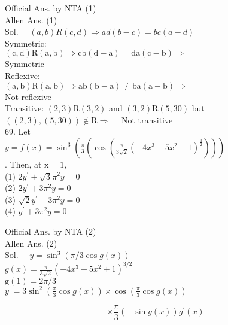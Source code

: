 \documentclass[10pt]{article}
\begin{document}
Official Ans. by NTA (1)\\
Allen Ans. (1)\\
Sol. \(\quad(a, b) R(c, d) \Rightarrow a d(b-c)=b c(a-d)\)\\
Symmetric:\\
\((\mathrm{c}, \mathrm{d}) \mathrm{R}(\mathrm{a}, \mathrm{b}) \Rightarrow \mathrm{cb}(\mathrm{d}-\mathrm{a})=\mathrm{da}(\mathrm{c}-\mathrm{b}) \Rightarrow\)\\
Symmetric\\
Reflexive:\\
\((\mathrm{a}, \mathrm{b}) \mathrm{R}(\mathrm{a}, \mathrm{b}) \Rightarrow \mathrm{ab}(\mathrm{b}-\mathrm{a}) \neq \mathrm{ba}(\mathrm{a}-\mathrm{b}) \Rightarrow\)\\
Not reflexive\\
Transitive: \((2,3) \mathrm{R}(3,2)\) and \((3,2) \mathrm{R}(5,30)\) but\\
\(((2,3),(5,30)) \notin \mathrm{R} \Rightarrow \quad\) Not transitive\\
69. Let\\
\(y=f(x)=\sin ^{3}\left(\frac{\pi}{3}\left(\cos \left(\frac{\pi}{3 \sqrt{2}}\left(-4 x^{3}+5 x^{2}+1\right)^{\frac{3}{2}}\right)\right)\right)\)\\
. Then, at \(\mathrm{x}=1\),\\
(1) \(2 y^{\prime}+\sqrt{3} \pi^{2} y=0\)\\
(2) \(2 y^{\prime}+3 \pi^{2} y=0\)\\
(3) \(\sqrt{2} y^{\prime}-3 \pi^{2} y=0\)\\
(4) \(y^{\prime}+3 \pi^{2} y=0\)

Official Ans. by NTA (2)\\
Allen Ans. (2)\\
Sol. \(\quad y=\sin ^{3}(\pi / 3 \cos g(x))\)\\
\(g(x)=\frac{\pi}{3 \sqrt{2}}\left(-4 x^{3}+5 x^{2}+1\right)^{3 / 2}\)\\
\(\mathrm{g}(1)=2 \pi / 3\)\\
\(y^{\prime}=3 \sin ^{2}\left(\frac{\pi}{3} \cos g(x)\right) \times \cos \left(\frac{\pi}{3} \cos g(x)\right)\)

\[
\times \frac{\pi}{3}(-\sin g(x)) g^{\prime}(x)
\]
\end{document}
